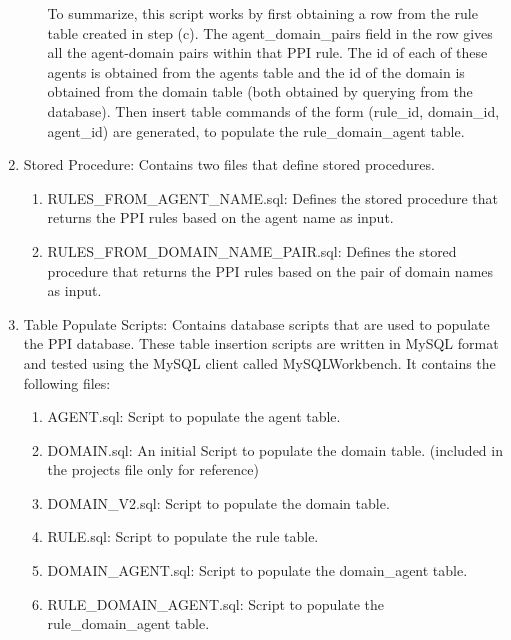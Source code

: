 \documentclass[msc,deptreport,ai]{infthesis}      %
\begin{document}
\begin{enumerate}
\begin{enumerate}
 		To summarize, this script works by first obtaining a row from the rule table created in step (c). The agent\_domain\_pairs field in the row gives all the agent-domain pairs within that PPI rule. The id of each of these agents is obtained from the agents table and the id of the domain is obtained from the domain table (both obtained by querying from the database). Then insert table commands of the form (rule\_id, domain\_id, agent\_id) are generated, to populate the rule\_domain\_agent table.
 	\end{enumerate}
 	\item Stored Procedure: Contains two files that define stored procedures.
 	\begin{enumerate}
 		\item RULES\_FROM\_AGENT\_NAME.sql: Defines the stored procedure that returns the PPI rules based on the agent name as input.
 		\item RULES\_FROM\_DOMAIN\_NAME\_PAIR.sql: Defines the stored procedure that returns the PPI rules based on the pair of domain names as input.
 	\end{enumerate}
 
 	\item Table Populate Scripts: Contains database scripts that are used to populate the PPI database. These table insertion scripts are written in MySQL format and tested using the MySQL client called MySQLWorkbench. It contains the following files:
 	 	\begin{enumerate}
 		\item AGENT.sql: Script to populate the agent table.
		\item DOMAIN.sql: An initial Script to populate the domain table. (included in the projects file only for reference)
		\item DOMAIN\_V2.sql: Script to populate the domain table.
		\item RULE.sql: Script to populate the rule table.
		\item DOMAIN\_AGENT.sql: Script to populate the domain\_agent table.
		\item RULE\_DOMAIN\_AGENT.sql:  Script to populate the rule\_domain\_agent table.
 	\end{enumerate}
 

\end{enumerate}
\end{document}

